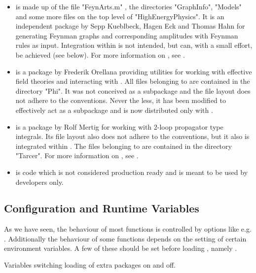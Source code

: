 \begin{itemize}

\item{{\bf \fa} is made up of the file "FeynArts.m" , the directories "GraphInfo", "Models" and some more files on the top level of "HighEnergyPhysics". It is an independent package by Sepp Kueblbeck, Hagen Eck and Thomas Hahn for generating Feynman graphs and corresponding amplitudes with Feynman rules as input. Integration within \fc is not intended, but can, with a small effort, be achieved (see \fphi below).
For more information on \fa, see \cite{feynarts}.}

\item{{\bf \fphi} is a package by Frederik Orellana providing utilities for working with effective field theories and interacting with \fa. All files belonging to \fphi are contained in the directory "Phi". It was not conceived as a \fc subpackage and the file layout does not adhere to the \fc conventions. Never the less, it has been modified to effectively act as a \fc subpackage and is now distributed only with \fc.}

\item{{\bf \tarcer} is a package by Rolf Mertig for working with 2-loop
propagator type integrals. Its file layout also does not adhere to the \fc conventions, but it also is integrated within \fc. The files belonging to \tarcer are contained in the directory "Tarcer". For more information on \tarcer, see \cite{Mertig:1998vk}.}

\item{{\bf \fcdevel} is code which is not considered production ready and is meant to be used by developers only.}

\end{itemize}

\subsection{Configuration and Runtime Variables}
\label{gamma5}

As we have seen, the behaviour of most functions is controlled by options like e.g. . Additionally the behaviour of some functions depends on the setting of certain environment variables. A few of these should be set before loading \fc, namely .

 {Variables switching loading of extra packages on and off.}

